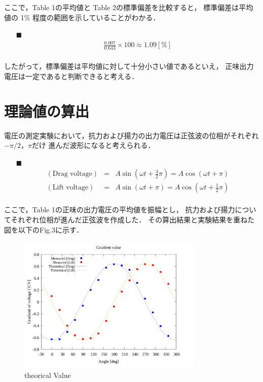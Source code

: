\documentclass[twocolumn,a4j]{jsarticle}
\begin{document}
ここで，Table 1の平均値と Table 2の標準偏差を比較すると，
標準偏差は平均値の 1\% 程度の範囲を示していることがわかる．

\begin{itemize}
    \item [$\blacksquare$] 
    \begin{eqnarray*}
        \frac{0.007}{0.643} × 100 \approx 1.09 [\%]\\
    \end{eqnarray*}
\end{itemize}

したがって，標準偏差は平均値に対して十分小さい値であるといえ，
正味出力電圧は一定であると判断できると考える．

\section{理論値の算出}
電圧の測定実験において，抗力および揚力の出力電圧は正弦波の位相がそれぞれ$-\pi/2$，$\pi$だけ
進んだ波形になると考えられる．

\begin{itemize}
    \item [$\blacksquare$] 
    \begin{eqnarray*}
        \mathrm{(Drag\;voltage)} &=& A \sin\left(\omega t + \frac{3}{2}\pi\right) = A \cos\left(\omega t + \pi\right)\\
        \mathrm{(Lift\;voltage)} &=& A \sin\left(\omega t + \pi\right) = A \cos\left(\omega t + \frac{1}{2}\pi\right)\\
    \end{eqnarray*}
\end{itemize}

ここで，Table 1の正味の出力電圧の平均値を振幅とし，
抗力および揚力についてそれぞれ位相が進んだ正弦波を作成した．
その算出結果と実験結果を重ねた図を以下のFig.3に示す．

\begin{figure}[htbp]
    \footnotesize
    \begin{center}
        \includegraphics[width=88mm]{../images_2/20/20_adjust-value.png}
        \caption{theorical Value}
    \end{center}
\end{figure}
\end{document}
